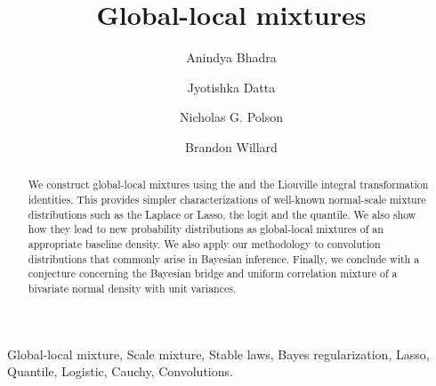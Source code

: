 \documentclass[lineno]{biometrika}
\begin{document}



\title{Global-local mixtures}

\author{Anindya Bhadra}
\author{Jyotishka Datta}
\author{Nicholas G. Polson \and Brandon Willard }


\maketitle
\begin{abstract}
\noindent 
We construct global-local mixtures using the \CS and the Liouville integral transformation identities. This provides simpler characterizations of well-known normal-scale mixture distributions such as the Laplace or Lasso, the logit and the quantile. We also show how they lead to new probability distributions as global-local mixtures of an appropriate baseline density. We also apply our methodology to convolution distributions that commonly arise in Bayesian inference. Finally, we conclude with a conjecture concerning the Bayesian bridge and uniform correlation mixture of a bivariate normal density with unit variances. 
\end{abstract}

\begin{keywords}
Global-local mixture, Scale mixture, Stable laws, Bayes regularization, Lasso, Quantile, Logistic, Cauchy, Convolutions. 
\end{keywords}
\end{document}
